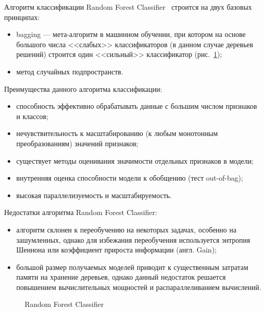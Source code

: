 Алгоритм классификации Random Forest Classifier~\cite{random_forest} строится на двух базовых принципах: 
\begin{itemize}
  \item bagging --- мета-алгоритм в машинном обучении, при котором на основе большого числа <<слабых>> классификаторов (в данном случае деревьев решений) строится один <<сильный>> классификатор (рис.~\ref{forest:forest});
  \item метод случайных подпространств.
\end{itemize}

Преимущества данного алгоритма классификации:
\begin{itemize}
  \item способность эффективно обрабатывать данные с большим числом признаков и классов;
  \item нечувствительность к масштабированию (к любым монотонным преобразованиям) значений признаков;
  \item существует методы оценивания значимости отдельных признаков в модели;
  \item внутренняя оценка способности модели к обобщению (тест out-of-bag);
  \item высокая параллелизуемость и масштабируемость.
\end{itemize}

Недостатки алгоритма Random Forest Classifier:
\begin{itemize}
  \item алгоритм склонен к переобучению на некоторых задачах, особенно на зашумленных, однако для избежания переобучения используется энтропия Шеннона или коэффициент прироста информации (англ. Gain);
  \item большой размер получаемых моделей приводит к существенным затратам памяти на хранение деревьев, однако данный недостаток решается повышением вычислительных мощностей и распараллеливанием вычислений.
\end{itemize}

\begin{figure}[h!]
\caption{ Random Forest Classifier }
\label{forest:forest}
\end{figure} 
